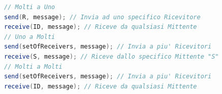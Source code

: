 \begin{lstlisting}[language=Java]
// Molti a Uno
send(R, message); // Invia ad uno specifico Ricevitore
receive(ID, message); // Riceve da qualsiasi Mittente
// Uno a Molti
send(setOfReceivers, message); // Invia a piu' Ricevitori
receive(S, message); // Riceve dallo specifico Mittente "S"
// Molti a Molti
send(setOfReceivers, message); // Invia a piu' Ricevitori
receive(ID, message); // Riceve da qualsiasi Mittente
\end{lstlisting}
